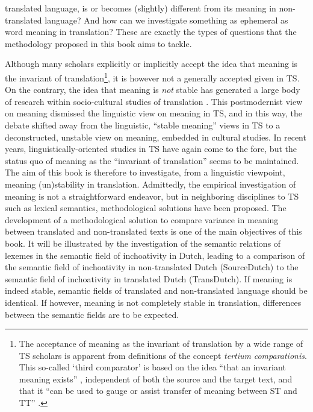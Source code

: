 translated language, is or becomes (slightly) different from its meaning in non-translated language? And how can we investigate something as ephemeral as word meaning in translation? These are exactly the types of questions that the methodology proposed in this book aims to tackle.

Although many scholars explicitly or implicitly accept the idea that meaning is the invariant of translation\footnote{The acceptance of meaning as the invariant of translation by a wide range of TS scholars is apparent from definitions of the concept \textit{tertium} \textit{comparationis}. This so-called ‘third comparator’ is based on the idea “that an invariant meaning exists” \citep[31]{HatimMunday2004}, independent of both the source and the target text, and that it “can be used to gauge or assist transfer of meaning between ST and TT” \citep[31]{HatimMunday2004}.}, it is however not a generally accepted given in TS. On the contrary, the idea that meaning is \textit{not} stable has generated a large body of research within socio-cultural studies of translation  \citep{baumgarten_ideology_2012}. This postmodernist view on meaning dismissed the linguistic view on meaning in TS, and in this way, the debate shifted away from the linguistic, “stable meaning” views in TS to a deconstructed, unstable view on meaning, embedded in cultural studies. In recent years, linguistically-oriented studies in TS have again come to the fore, but the status quo of meaning as the “invariant of translation” seems to be maintained. The aim of this book is therefore to investigate, from a linguistic viewpoint, meaning (un)stability in translation. Admittedly, the empirical investigation of meaning is not a straightforward endeavor, but in neighboring disciplines to TS such as lexical semantics, methodological solutions have been proposed. The development of a methodological solution to compare variance in meaning between translated and non-translated texts is one of the main objectives of this book. It will be illustrated by the investigation of the semantic relations of lexemes in the semantic field of inchoativity in Dutch, leading to a comparison of the semantic field of inchoativity in non-translated Dutch (SourceDutch) to the semantic field of inchoativity in translated Dutch (TransDutch). If meaning is indeed stable, semantic fields of translated and non-translated language should be identical. If however, meaning is not completely stable in translation, differences between the semantic fields are to be expected. 

